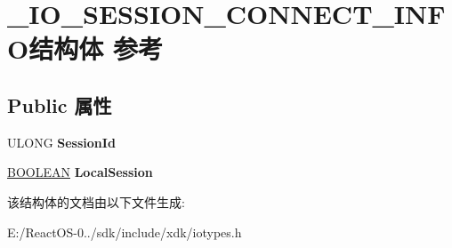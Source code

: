 \hypertarget{struct___i_o___s_e_s_s_i_o_n___c_o_n_n_e_c_t___i_n_f_o}{}\section{\+\_\+\+I\+O\+\_\+\+S\+E\+S\+S\+I\+O\+N\+\_\+\+C\+O\+N\+N\+E\+C\+T\+\_\+\+I\+N\+F\+O结构体 参考}
\label{struct___i_o___s_e_s_s_i_o_n___c_o_n_n_e_c_t___i_n_f_o}
\subsection*{Public 属性}
\begin{DoxyCompactItemize}
\item 
\mbox{\label{struct___i_o___s_e_s_s_i_o_n___c_o_n_n_e_c_t___i_n_f_o_a1efdeb18c73580d10164bab628d9cf46}} 
U\+L\+O\+NG {\bfseries Session\+Id}
\item 
\mbox{\label{struct___i_o___s_e_s_s_i_o_n___c_o_n_n_e_c_t___i_n_f_o_a504a0f2cc9a57c5ebf09af912aedbf7f}} 
\hyperlink{_processor_bind_8h_a112e3146cb38b6ee95e64d85842e380a}{B\+O\+O\+L\+E\+AN} {\bfseries Local\+Session}
\end{DoxyCompactItemize}


该结构体的文档由以下文件生成\+:\begin{DoxyCompactItemize}
\item 
E\+:/\+React\+O\+S-\/0../sdk/include/xdk/iotypes.\+h\end{DoxyCompactItemize}
